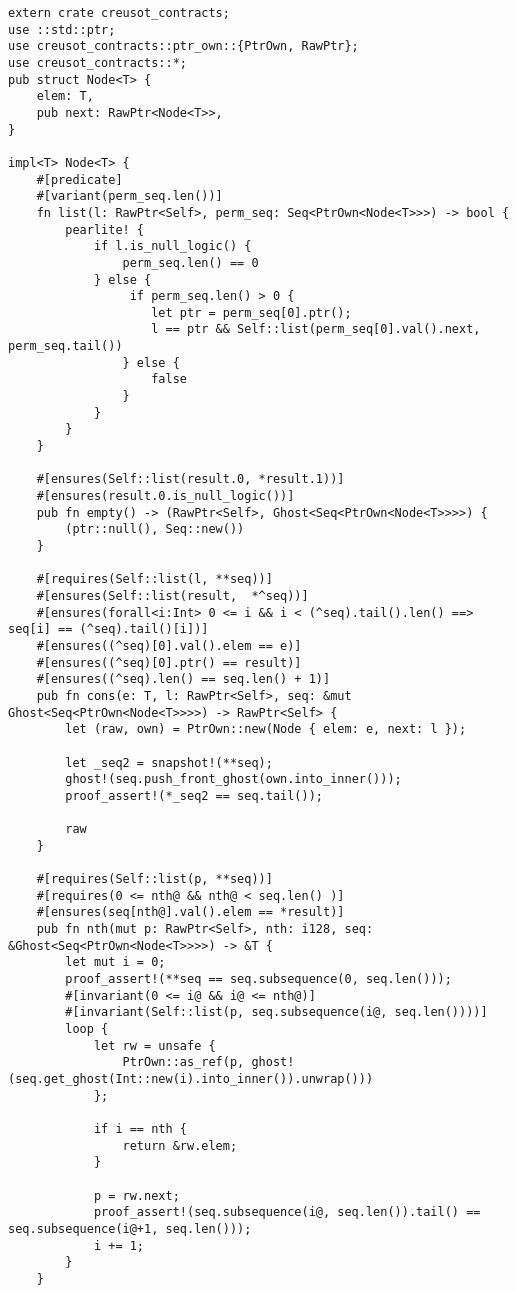 \begin{verbatim}
extern crate creusot_contracts;
use ::std::ptr;
use creusot_contracts::ptr_own::{PtrOwn, RawPtr};
use creusot_contracts::*;
pub struct Node<T> {
    elem: T,
    pub next: RawPtr<Node<T>>,
}

impl<T> Node<T> {
    #[predicate]
    #[variant(perm_seq.len())]
    fn list(l: RawPtr<Self>, perm_seq: Seq<PtrOwn<Node<T>>>) -> bool {
        pearlite! {
            if l.is_null_logic() {
                perm_seq.len() == 0
            } else {
                 if perm_seq.len() > 0 {
                    let ptr = perm_seq[0].ptr();
                    l == ptr && Self::list(perm_seq[0].val().next, perm_seq.tail())
                } else {
                    false
                }
            }
        }
    }

    #[ensures(Self::list(result.0, *result.1))]
    #[ensures(result.0.is_null_logic())]
    pub fn empty() -> (RawPtr<Self>, Ghost<Seq<PtrOwn<Node<T>>>>) {
        (ptr::null(), Seq::new())
    }

    #[requires(Self::list(l, **seq))]
    #[ensures(Self::list(result,  *^seq))]
    #[ensures(forall<i:Int> 0 <= i && i < (^seq).tail().len() ==> seq[i] == (^seq).tail()[i])]
    #[ensures((^seq)[0].val().elem == e)]
    #[ensures((^seq)[0].ptr() == result)]
    #[ensures((^seq).len() == seq.len() + 1)]
    pub fn cons(e: T, l: RawPtr<Self>, seq: &mut Ghost<Seq<PtrOwn<Node<T>>>>) -> RawPtr<Self> {
        let (raw, own) = PtrOwn::new(Node { elem: e, next: l });

        let _seq2 = snapshot!(**seq);
        ghost!(seq.push_front_ghost(own.into_inner()));
        proof_assert!(*_seq2 == seq.tail());

        raw
    }

    #[requires(Self::list(p, **seq))]
    #[requires(0 <= nth@ && nth@ < seq.len() )]
    #[ensures(seq[nth@].val().elem == *result)]
    pub fn nth(mut p: RawPtr<Self>, nth: i128, seq: &Ghost<Seq<PtrOwn<Node<T>>>>) -> &T {
        let mut i = 0;
        proof_assert!(**seq == seq.subsequence(0, seq.len()));
        #[invariant(0 <= i@ && i@ <= nth@)]
        #[invariant(Self::list(p, seq.subsequence(i@, seq.len())))]
        loop {
            let rw = unsafe {
                PtrOwn::as_ref(p, ghost!(seq.get_ghost(Int::new(i).into_inner()).unwrap()))
            };

            if i == nth {
                return &rw.elem;
            }

            p = rw.next;
            proof_assert!(seq.subsequence(i@, seq.len()).tail() == seq.subsequence(i@+1, seq.len()));
            i += 1;
        }
    }


\end{verbatim}
